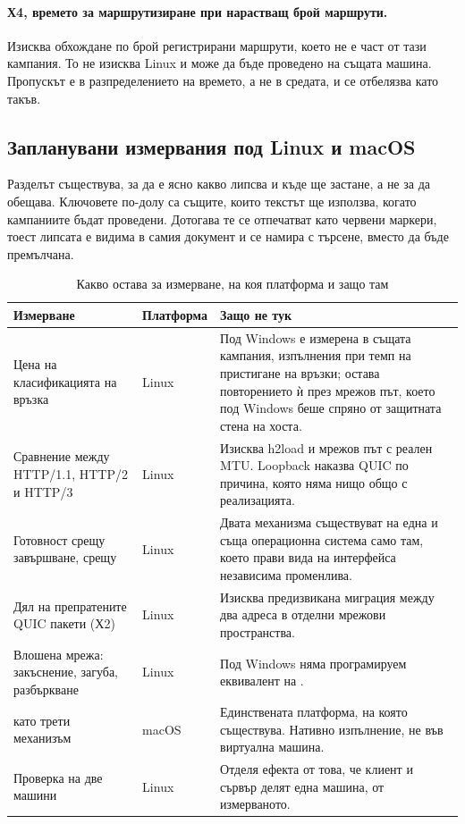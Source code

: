\paragraph{Х4, времето за маршрутизиране при нарастващ брой маршрути.} Изисква обхождане по
брой регистрирани маршрути, което не е част от тази кампания. То не изисква Linux и може да
бъде проведено на същата машина. Пропускът е в разпределението на времето, а не в средата, и
се отбелязва като такъв.

\subsection{Запланувани измервания под Linux и macOS}
\label{sec:planned}

Разделът съществува, за да е ясно какво липсва и къде ще застане, а не за да обещава.
Ключовете по-долу са същите, които текстът ще използва, когато кампаниите бъдат проведени.
Дотогава те се отпечатват като червени маркери, тоест липсата е видима в самия документ и се
намира с търсене, вместо да бъде премълчана.

\begin{table}[H]
\centering
\caption{Какво остава за измерване, на коя платформа и защо там}
\label{tab:planned}
\begin{tabular}{@{}L{3.7cm}L{2.5cm}L{7.8cm}@{}}
\toprule
\textbf{Измерване} & \textbf{Платформа} & \textbf{Защо не тук} \\
\midrule
Цена на класификацията на връзка & Linux & Под Windows е измерена в същата кампания,
 изпълнения при темп на пристигане на връзки; остава повторението ѝ
през мрежов път, което под Windows беше спряно от защитната стена на хоста. \\
Сравнение между HTTP/1.1, HTTP/2 и HTTP/3 & Linux & Изисква h2load и мрежов път с реален
MTU. Loopback наказва QUIC по причина, която няма нищо общо с реализацията. \\
Готовност срещу завършване,  срещу  & Linux & Двата механизма
съществуват на една и съща операционна система само там, което прави вида на интерфейса
независима променлива. \\
Дял на препратените QUIC пакети (Х2) & Linux & Изисква предизвикана миграция между два
адреса в отделни мрежови пространства. \\
Влошена мрежа: закъснение, загуба, разбъркване & Linux & Под Windows няма програмируем
еквивалент на . \\
 като трети механизъм & macOS & Единствената платформа, на която съществува.
Нативно изпълнение, не във виртуална машина. \\
Проверка на две машини & Linux & Отделя ефекта от това, че клиент и сървър делят една
машина, от измерваното. \\
\bottomrule
\end{tabular}
\end{table}

